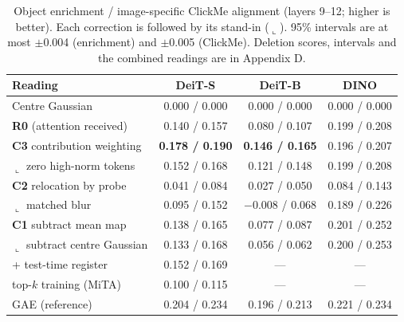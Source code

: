 \documentclass{article}
\begin{document}
\begin{table}[t]
\caption{Object enrichment / image-specific ClickMe alignment (layers 9--12; higher is better). Each correction is followed by its stand-in ($\llcorner$). 95\% intervals are at most $\pm$0.004 (enrichment) and $\pm$0.005 (ClickMe). Deletion scores, intervals and the combined readings are in Appendix D.}
\label{tab:main}
\centering
\small
\begin{tabular}{lccc}
\toprule
Reading & DeiT-S & DeiT-B & DINO \\
\midrule
Centre Gaussian & 0.000 / 0.000 & 0.000 / 0.000 & 0.000 / 0.000 \\
\textbf{R0} (attention received) & 0.140 / 0.157 & 0.080 / 0.107 & 0.199 / 0.208 \\
\textbf{C3} contribution weighting & \textbf{0.178 / 0.190} & \textbf{0.146 / 0.165} & 0.196 / 0.207 \\
\quad$\llcorner$ zero high-norm tokens & 0.152 / 0.168 & 0.121 / 0.148 & 0.199 / 0.208 \\
\textbf{C2} relocation by probe & 0.041 / 0.084 & 0.027 / 0.050 & 0.084 / 0.143 \\
\quad$\llcorner$ matched blur & 0.095 / 0.152 & $-$0.008 / 0.068 & 0.189 / 0.226 \\
\textbf{C1} subtract mean map & 0.138 / 0.165 & 0.077 / 0.087 & 0.201 / 0.252 \\
\quad$\llcorner$ subtract centre Gaussian & 0.133 / 0.168 & 0.056 / 0.062 & 0.200 / 0.253 \\
+ test-time register & 0.152 / 0.169 & --- & --- \\
top-$k$ training (MiTA) & 0.100 / 0.115 & --- & --- \\
GAE (reference) & 0.204 / 0.234 & 0.196 / 0.213 & 0.221 / 0.234 \\
\bottomrule
\end{tabular}
\end{table}
\end{document}
